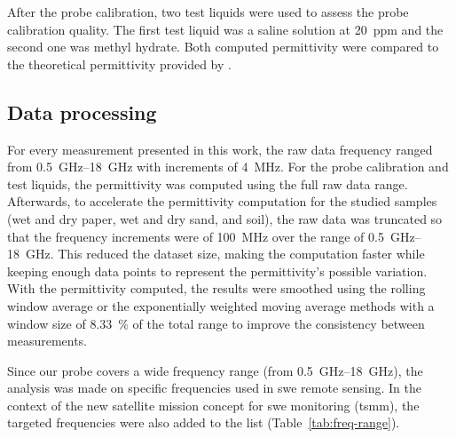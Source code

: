 After the probe calibration, two test liquids were used to assess the probe calibration quality.
The first test liquid was a saline solution at \qty{20}{ppm} and the second one was methyl hydrate.
Both computed permittivity were compared to the theoretical permittivity provided by \textcite{Nyshadham1992}.

\subsection{Data processing}\label{subsec:metho-smooth}
For every measurement presented in this work, the raw data frequency ranged from \SIrange{0.5}{18}{\giga\hertz} with increments of \SI{4}{\mega\hertz}. 
For the probe calibration and test liquids, the permittivity was computed using the full raw data range.
Afterwards, to accelerate the permittivity computation for the studied samples (wet and dry paper, wet and dry sand, and soil), the raw data was truncated so that the frequency increments were of \SI{100}{\mega\hertz} over the range of \SIrange{0.5}{18}{\giga\hertz}.
This reduced the dataset size, making the computation faster while keeping enough data points to represent the permittivity's possible variation.
With the permittivity computed, the results were smoothed using the rolling window average or the exponentially weighted moving average methods with a window size of \qty{8.33}{\percent} of the total range to improve the consistency between measurements.

Since our probe covers a wide frequency range (from \qtyrange{0.5}{18}{\giga\hertz}), the analysis was made on specific frequencies used in \ac{swe} remote sensing.
In the context of the new satellite mission concept for \ac{swe} monitoring (\ac{tsmm}), the targeted frequencies were also added to the list (Table~\ref{tab:freq-range}).

